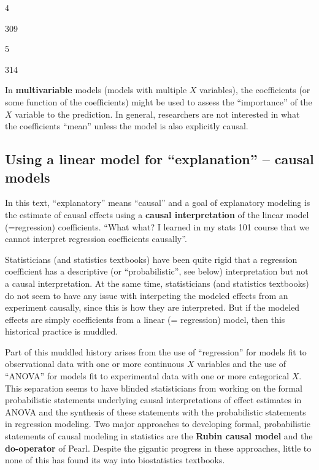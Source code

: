 \documentclass[]{book}
\begin{document}
4

309

5

314

In \textbf{multivariable} models (models with multiple \(X\) variables), the coefficients (or some function of the coefficients) might be used to assess the ``importance'' of the \(X\) variable to the prediction. In general, researchers are not interested in what the coefficients ``mean'' unless the model is also explicitly causal.

\hypertarget{using-a-linear-model-for-explanation-causal-models}{%
\subsection{Using a linear model for ``explanation'' -- causal models}\label{using-a-linear-model-for-explanation-causal-models}}

In this text, ``explanatory'' means ``causal'' and a goal of explanatory modeling is the estimate of causal effects using a \textbf{causal interpretation} of the linear model (=regression) coefficients. ``What what? I learned in my stats 101 course that we cannot interpret regression coefficients causally''.

Statisticians (and statistics textbooks) have been quite rigid that a regression coefficient has a descriptive (or ``probabilistic'', see below) interpretation but not a causal interpretation. At the same time, statisticians (and statistics textbooks) do not seem to have any issue with interpeting the modeled effects from an experiment causally, since this is how they are interpreted. But if the modeled effects are simply coefficients from a linear (= regression) model, then this historical practice is muddled.

Part of this muddled history arises from the use of ``regression'' for models fit to observational data with one or more continuous \(X\) variables and the use of ``ANOVA'' for models fit to experimental data with one or more categorical \(X\). This separation seems to have blinded statisticians from working on the formal probabilistic statements underlying causal interpretations of effect estimates in ANOVA and the synthesis of these statements with the probabilistic statements in regression modeling. Two major approaches to developing formal, probabilistic statements of causal modeling in statistics are the \textbf{Rubin causal model} and the \textbf{do-operator} of Pearl. Despite the gigantic progress in these approaches, little to none of this has found its way into biostatistics textbooks.
\end{document}
